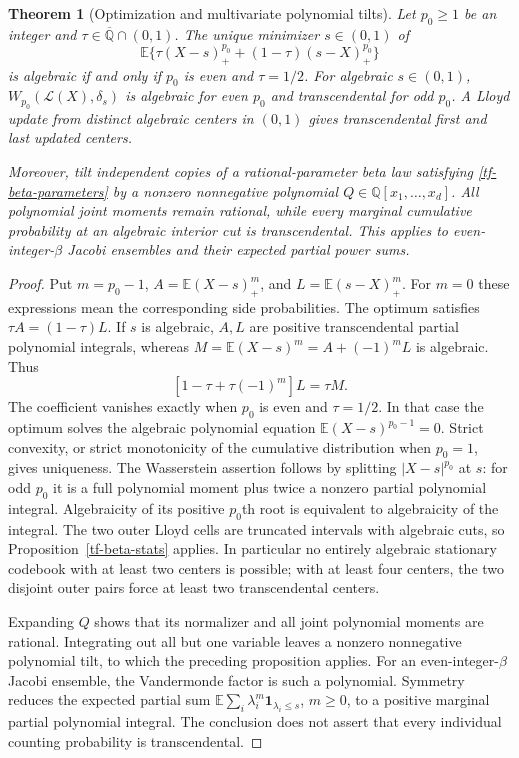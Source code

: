 \documentclass[11pt,a4paper]{article}
\newtheorem{theorem}{Theorem}[section]
\theoremstyle{definition}
\theoremstyle{remark}
\numberwithin{equation}{section}
\newcommand{\Qbar}{\overline{\mathbb Q}}
\begin{document}
\begin{theorem}[Optimization and multivariate polynomial tilts]
\label{tf-beta-optimization}
Let $p_0\ge1$ be an integer and $\tau\in\Qbar\cap(0,1)$.
The unique minimizer $s\in(0,1)$ of
\[
 \mathbb E\{\tau(X-s)_+^{p_0}+(1-\tau)(s-X)_+^{p_0}\}
\]
is algebraic if and only if $p_0$ is even and $\tau=1/2$.
For algebraic $s\in(0,1)$,
$W_{p_0}(\mathcal L(X),\delta_s)$ is algebraic for even $p_0$
and transcendental for odd $p_0$.
A Lloyd update from distinct algebraic centers in $(0,1)$ gives
transcendental first and last updated centers.

Moreover, tilt independent copies of a rational-parameter beta law
satisfying \eqref{tf-beta-parameters} by a nonzero nonnegative polynomial
$Q\in\mathbb Q[x_1,\ldots,x_d]$.  All polynomial joint moments remain
rational, while every marginal cumulative probability at an algebraic
interior cut is transcendental.  This applies to even-integer-$\beta$
Jacobi ensembles and their expected partial power sums.
\end{theorem}
\begin{proof}
Put $m=p_0-1$, $A=\mathbb E(X-s)_+^m$, and
$L=\mathbb E(s-X)_+^m$.  For $m=0$ these expressions mean the corresponding
side probabilities.  The optimum satisfies $\tau A=(1-\tau)L$.
If $s$ is algebraic, $A,L$ are positive transcendental partial
polynomial integrals, whereas
$M=\mathbb E(X-s)^m=A+(-1)^mL$ is algebraic.  Thus
\[
 [1-\tau+\tau(-1)^m]L=\tau M.
\]
The coefficient vanishes exactly when $p_0$ is even and $\tau=1/2$.
In that case the optimum solves the algebraic polynomial equation
$\mathbb E(X-s)^{p_0-1}=0$.  Strict convexity, or strict monotonicity of
the cumulative distribution when $p_0=1$, gives uniqueness.
The Wasserstein assertion follows by splitting $|X-s|^{p_0}$ at $s$:
for odd $p_0$ it is a full polynomial moment plus twice a nonzero
partial polynomial integral.  Algebraicity of its positive $p_0$th
root is equivalent to algebraicity of the integral.
The two outer Lloyd cells are truncated intervals with algebraic cuts,
so Proposition~\ref{tf-beta-stats} applies.  In particular no entirely
algebraic stationary codebook with at least two centers is possible;
with at least four centers, the two disjoint outer pairs force at least
two transcendental centers.

Expanding $Q$ shows that its normalizer and all joint polynomial moments
are rational.  Integrating out all but one variable leaves a nonzero
nonnegative polynomial tilt, to which the preceding proposition applies.
For an even-integer-$\beta$ Jacobi ensemble, the Vandermonde factor is
such a polynomial.  Symmetry reduces the expected partial sum
$\mathbb E\sum_i\lambda_i^m\mathbf1_{\lambda_i\le s}$, $m\ge0$, to a
positive marginal partial polynomial integral.  The conclusion does
not assert that every individual counting probability is transcendental.
\end{proof}
\end{document}
